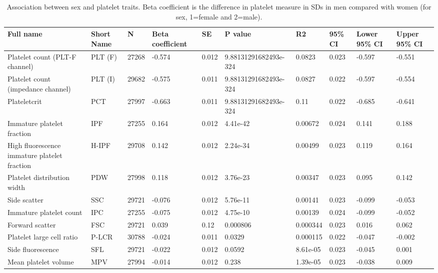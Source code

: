 \documentclass[11pt,twoside]{bristolthesis}
\begin{document}
\begin{landscape}\begin{table}

\caption[Association between sex and platelet traits]{\label{tab:sex-platelets}Association between sex and platelet traits. Beta coefficient is the difference in platelet measure in SDs in men compared with women (for sex, 1=female and 2=male).}
\centering
\begin{tabu} to 
\toprule
Full name & Short Name & N & Βeta coefficient & SE & P value & R2 & 95\% CI & Lower 95\% CI & Upper 95\% CI\\
\midrule
Platelet count (PLT-F channel) & PLT (F) & 27268 & -0.574 & 0.012 & 9.88131291682493e-324 & 0.0823 & 0.023 & -0.597 & -0.551\\
Platelet count (impedance channel) & PLT (I) & 29682 & -0.575 & 0.011 & 9.88131291682493e-324 & 0.0827 & 0.022 & -0.597 & -0.554\\
Plateletcrit & PCT & 27997 & -0.663 & 0.011 & 9.88131291682493e-324 & 0.11 & 0.022 & -0.685 & -0.641\\
Immature platelet fraction & IPF & 27255 & 0.164 & 0.012 & 4.41e-42 & 0.00672 & 0.024 & 0.141 & 0.188\\
High fluorescence immature platelet fraction & H-IPF & 29708 & 0.142 & 0.012 & 2.24e-34 & 0.00499 & 0.023 & 0.119 & 0.164\\
\addlinespace
Platelet distribution width & PDW & 27998 & 0.118 & 0.012 & 3.76e-23 & 0.00347 & 0.023 & 0.095 & 0.142\\
Side scatter & SSC & 29721 & -0.076 & 0.012 & 5.76e-11 & 0.00141 & 0.023 & -0.099 & -0.053\\
Immature platelet count & IPC & 27255 & -0.075 & 0.012 & 4.75e-10 & 0.00139 & 0.024 & -0.099 & -0.052\\
Forward scatter & FSC & 29721 & 0.039 & 0.12 & 0.000806 & 0.000344 & 0.023 & 0.016 & 0.062\\
Platelet large cell ratio & P-LCR & 30788 & -0.024 & 0.011 & 0.0329 & 0.000115 & 0.022 & -0.047 & -0.002\\
\addlinespace
Side fluorescence & SFL & 29721 & -0.022 & 0.012 & 0.0592 & 8.61e-05 & 0.023 & -0.045 & 0.001\\
Mean platelet volume & MPV & 27994 & -0.014 & 0.012 & 0.238 & 1.39e-05 & 0.023 & -0.038 & 0.009\\
\bottomrule
\end{tabu}
\end{table}
\end{landscape}
\end{document}
